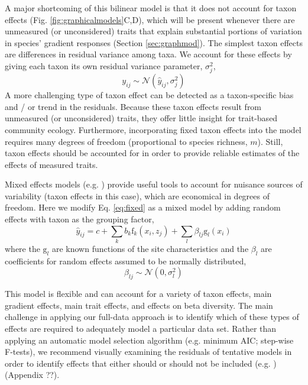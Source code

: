 \documentclass[12pt]{ecology}
\begin{document}
A major shortcoming of this bilinear model is that it does not account for taxon effects (Fig. \ref{fig:graphicalmodels}C,D), which will be present whenever there are unmeasured (or unconsidered) traits that explain substantial portions of variation in species' gradient responses (Section \ref{sec:graphmod}).  The simplest taxon effects are differences in residual variance among taxa.  We account for these effects by giving each taxon its own residual variance parameter, $\sigma_j^2$,
\begin{equation}
y_{ij} \sim \mathcal{N}(\hat{y}_{ij},\sigma_j^2)
\end{equation}
A more challenging type of taxon effect can be detected as a taxon-specific bias and / or trend in the residuals.  Because these taxon effects result from unmeasured (or unconsidered) traits, they offer little insight for trait-based community ecology.  Furthermore, incorporating fixed taxon effects into the model requires many degrees of freedom (proportional to species richness, $m$).  Still, taxon effects should be accounted for in order to provide reliable estimates of the effects of measured traits.

Mixed effects models (e.g. ) provide useful tools to account for nuisance sources of variability (taxon effects in this case), which are economical in degrees of freedom.  Here we modify Eq. \ref{eq:fixed} as a mixed model by adding random effects with taxon as the grouping factor,
\begin{equation}
\hat{y}_{ij} = c + 
	\sum_k b_k \mathrm{f}_k (x_i, z_j) + 
	\sum_l \beta_{lj} \mathrm{g}_l (x_i)
\end{equation}
where the $\mathrm{g}_l$ are known functions of the site characteristics and the $\beta_l$ are coefficients for random effects assumed to be normally distributed,
\begin{equation}
\beta_{lj} \sim \mathcal{N}(0,\sigma_l^2)
\end{equation}

This model is flexible and can account for a variety of taxon effects, main gradient effects, main trait effects, and effects on beta diversity.  The main challenge in applying our full-data approach is to identify which of these types of effects are required to adequately model a particular data set.  Rather than applying an automatic model selection algorithm (e.g. minimum AIC; step-wise F-tests), we recommend visually examining the residuals of tentative models in order to identify effects that either should or should not be included (e.g. ) (Appendix ??).
\end{document}
